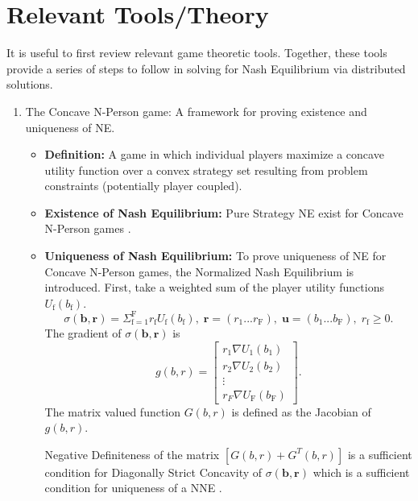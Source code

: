\documentclass[12pt,a4paper]{report}
\begin{document}
\section{Relevant Tools/Theory}\label{tools}
It is useful to first review relevant game theoretic tools. Together, these tools provide a series of steps to follow in solving for Nash Equilibrium via distributed solutions. 

\begin{enumerate}
\item The Concave N-Person game: A framework for proving existence and uniqueness of NE.

\begin{itemize}
\item
\textbf{Definition:} A game in which individual players maximize a concave utility function over a convex strategy set resulting from problem constraints (potentially player coupled). 
\item 
\textbf{Existence of Nash Equilibrium:} Pure Strategy NE exist for Concave N-Person  games \cite[Thm1]{rosen1964existence}. 
\item
\textbf{Uniqueness of Nash Equilibrium:} To prove uniqueness of NE for Concave N-Person  games, the Normalized Nash Equilibrium is introduced.
First, take a weighted sum of the player utility functions $U_{\mathrm{f}}(b_{\text{f}})$.
\begin{equation*}
\sigma(\mathbf{b},\mathbf{r})  = \Sigma_{\mathrm{f=1}}^{\mathrm{F}} r_{\mathrm{f}}U_{\mathrm{f}}(b_{\text{f}}),\; \mathbf{r}=(r_{\text{1}}... r_{\text{F}})
,\; \mathbf{u}=(b_{\text{1}}... b_{\text{F}})
, \; 
r_{\mathrm{f}} \geq 0.
\end{equation*}
The gradient of $
\sigma(\mathbf{b},\mathbf{r})$
is  
\begin{equation}
g(b,r)= 
\begin{bmatrix}
r_1 \nabla U_{1}(b_1)
\\
r_2 \nabla U_{2}(b_2)
\\
\vdots\\
r_F \nabla U_{\text{F}}(b_{\text{F}})
\end{bmatrix}.
\end{equation}
 The matrix valued function $G(b,r) $ is defined as the Jacobian of $g(b,r) $.



Negative Definiteness of the matrix $[G(b,r)+G^{T}(b,r)] $ is a sufficient condition for Diagonally Strict Concavity of $\sigma(\mathbf{b},\mathbf{r})$ which is a sufficient condition for uniqueness of a NNE \cite[Thm4]{rosen1964existence}.



\end{itemize}
\end{enumerate}
\end{document}
